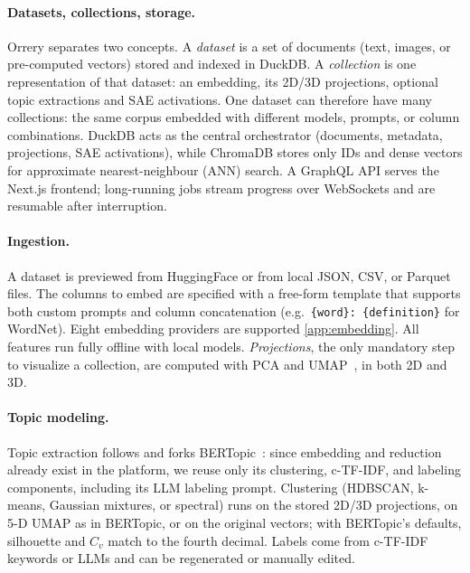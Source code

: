 \documentclass[11pt]{article}
\begin{document}

\paragraph{Datasets, collections, storage.}
Orrery separates two concepts. A \emph{dataset} is a set of documents (text, images, or pre-computed vectors) stored and indexed in DuckDB. A \emph{collection} is one representation of that dataset: an embedding, its 2D/3D projections, optional topic extractions and SAE activations. One dataset can therefore have many collections: the same corpus embedded with different models, prompts, or column combinations. DuckDB acts as the central orchestrator (documents, metadata, projections, SAE activations), while ChromaDB \cite{chroma2023} stores only IDs and dense vectors for approximate nearest-neighbour (ANN) search. A GraphQL API serves the Next.js frontend; long-running jobs stream progress over WebSockets and are resumable after interruption.


\paragraph{Ingestion.}
A dataset is previewed from HuggingFace or from local JSON, CSV, or Parquet files. The columns to embed are specified with a free-form template that supports both custom prompts and column concatenation (e.g.\ \texttt{\{word\}: \{definition\}} for WordNet). Eight embedding providers are supported \ref{app:embedding}. All features run fully offline with local models. \emph{Projections}, the only mandatory step to visualize a collection, are computed with PCA and UMAP~\cite{McInnes2018}, in both 2D and 3D. 

\paragraph{Topic modeling.}

Topic extraction follows and forks BERTopic~\cite{grootendorst2022bertopicneuraltopicmodeling}: since embedding and reduction already exist in the platform, we reuse only its clustering, c-TF-IDF, and labeling components, including its LLM labeling prompt. Clustering (HDBSCAN, k-means, Gaussian mixtures, or spectral) runs on the stored 2D/3D projections, on 5-D UMAP as in BERTopic, or on the original vectors; with BERTopic's defaults, silhouette and $C_v$ match to the fourth decimal. Labels come from c-TF-IDF keywords or LLMs and can be regenerated or manually edited.
\end{document}
